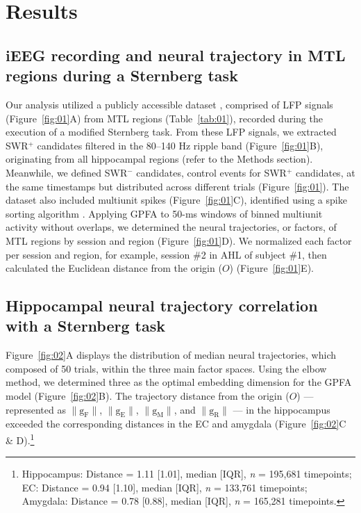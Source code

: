 \section{Results}
\subsection{iEEG recording and neural trajectory in MTL regions during a Sternberg task}
Our analysis utilized a publicly accessible dataset \cite{boran_dataset_2020}, comprised of LFP signals (Figure~\ref{fig:01}A) from MTL regions (Table~\ref{tab:01}), recorded during the execution of a modified Sternberg task. From these LFP signals, we extracted SWR$^+$ candidates filtered in the 80--140 Hz ripple band (Figure~\ref{fig:01}B), originating from all hippocampal regions (refer to the Methods section). Meanwhile, we defined SWR$^-$ candidates, control events for SWR$^+$ candidates, at the same timestamps but distributed across different trials (Figure~\ref{fig:01}). The dataset also included multiunit spikes (Figure~\ref{fig:01}C), identified using a spike sorting algorithm \cite{niediek_reliable_2016}. Applying GPFA \cite{yu_gaussian-process_2009} to 50-ms windows of binned multiunit activity without overlaps, we determined the neural trajectories, or factors, of MTL regions by session and region (Figure~\ref{fig:01}D). We normalized each factor per session and region, for example, session \#2 in AHL of subject \#1, then calculated the Euclidean distance from the origin ($O$) (Figure~\ref{fig:01}E).

\subsection{Hippocampal neural trajectory correlation with a Sternberg task}
Figure~\ref{fig:02}A displays the distribution of median neural trajectories, which composed of 50 trials, within the three main factor spaces. Using the elbow method, we determined three as the optimal embedding dimension for the GPFA model (Figure~\ref{fig:02}B). The trajectory distance from the origin ($O$) --- represented as $\mathrm{\lVert g_{F} \rVert}$, $\mathrm{\lVert g_{E} \rVert}$, $\mathrm{\lVert g_{M} \rVert}$, and $\mathrm{\lVert g_{R} \rVert}$ --- in the hippocampus exceeded the corresponding distances in the EC and amygdala (Figure~\ref{fig:02}C \& D).\footnote{Hippocampus: Distance = 1.11 [1.01], median [IQR], \textit{n} = 195,681 timepoints; EC: Distance = 0.94 [1.10], median [IQR], \textit{n} = 133,761 timepoints; Amygdala: Distance = 0.78 [0.88], median [IQR], \textit{n} = 165,281 timepoints.}


